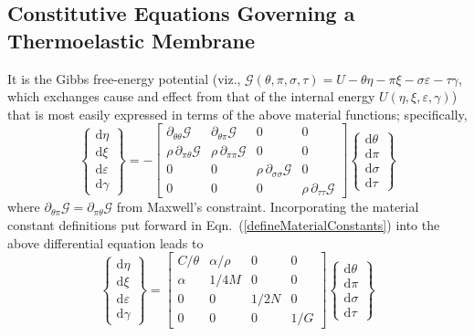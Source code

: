 \subsection{Constitutive Equations Governing a Thermoelastic Membrane}

It is the Gibbs free-energy potential (viz., $\mathcal{G} ( \theta , \pi , \sigma , \tau ) = U - \theta \eta - \pi \xi - \sigma \varepsilon - \tau \gamma$, which exchanges cause and effect from that of the internal energy $U ( \eta , \xi , \varepsilon , \gamma )$) that is most easily expressed in terms of the above material functions; specifically,
\begin{displaymath}
\left\{ \begin{matrix}
\mathrm{d}\eta \\ \mathrm{d} \xi \\
\mathrm{d} \varepsilon \\ \mathrm{d} \gamma
\end{matrix} \right\} = -\begin{bmatrix}
\partial_{\theta\theta} \mathcal{G} & 
\partial_{\theta\pi} \mathcal{G} & 0 & 0 \\ 
\rho \, \partial_{\pi\theta} \mathcal{G} & 
\rho \, \partial_{\pi\pi} \mathcal{G} & 0 & 0 \\
0 & 0 & \rho \, \partial_{\sigma\sigma} \mathcal{G} & 0 \\
0 & 0 & 0 & \rho \, \partial_{\tau\tau} \mathcal{G}
\end{bmatrix} 
\left\{ \begin{matrix}
\mathrm{d} \theta \\ \mathrm{d} \pi \\
\mathrm{d} \sigma \\ \mathrm{d} \tau
\end{matrix} \right\} 
\end{displaymath}
where $\partial_{\theta\pi} \mathcal{G} = \partial_{\pi\theta} \mathcal{G}$ from Maxwell's constraint.  Incorporating the material constant definitions put forward in Eqn.~(\ref{defineMaterialConstants}) into the above differential equation leads to
\begin{displaymath}
\label{GibbsMembrane}
\left\{ \begin{matrix}
\mathrm{d}\eta \\ \mathrm{d} \xi \\
\mathrm{d} \varepsilon \\ \mathrm{d} \gamma
\end{matrix} \right\} = \begin{bmatrix}
C / \theta & \alpha / \rho & 0 & 0 \\ 
\alpha & 1 / 4 M & 0 & 0 \\
0 & 0 & 1 / 2 N & 0 \\
0 & 0 & 0 & 1 / G
\end{bmatrix} 
\left\{ \begin{matrix}
\mathrm{d} \theta \\ \mathrm{d} \pi \\
\mathrm{d} \sigma \\ \mathrm{d} \tau
\end{matrix} \right\} 
\end{displaymath}
